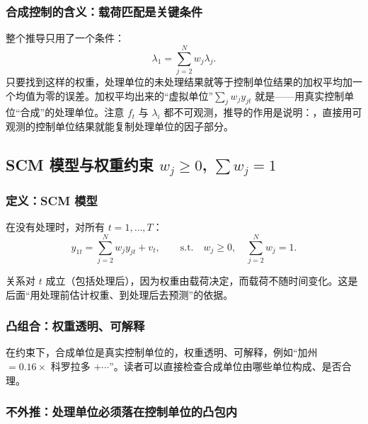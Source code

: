 \subsubsection{合成控制的含义：载荷匹配是关键条件}

整个推导只用了一个条件：
\begin{equation}\label{eq:U16-loading-match}
\lambda_1=\sum_{j=2}^N w_j\lambda_j .
\end{equation}
只要找到这样的权重，处理单位的未处理结果就等于控制单位结果的加权平均加一个均值为零的误差。加权平均出来的“虚拟单位”$\sum_jw_jy_{jt}$ 就是——用真实控制单位“合成”的处理单位。注意 $f_t$ 与 $\lambda_i$ 都不可观测，推导的作用是说明：，直接用可观测的控制单位结果就能复制处理单位的因子部分。

\subsection{SCM 模型与权重约束 \texorpdfstring{$w_j\ge0$, $\sum w_j=1$}{w\_j >= 0, sum w\_j = 1}}

\subsubsection{定义：SCM 模型}

\begin{defn}[SCM 模型]
在没有处理时，对所有 $t=1,\dots,T$：
\begin{equation}\label{eq:U16-scm}
y_{1t}=\sum_{j=2}^N w_jy_{jt}+v_t,\qquad \text{s.t.}\quad w_j\ge0,\quad \sum_{j=2}^N w_j=1 .
\end{equation}
\end{defn}

关系对 $t$ 成立（包括处理后），因为权重由载荷决定，而载荷不随时间变化。这是后面“用处理前估计权重、到处理后去预测”的依据。

\subsubsection{凸组合：权重透明、可解释}

在约束下，合成单位是真实控制单位的，权重透明、可解释，例如“加州 $=0.16\times$ 科罗拉多 $+\cdots$”。读者可以直接检查合成单位由哪些单位构成、是否合理。

\subsubsection{不外推：处理单位必须落在控制单位的凸包内}

